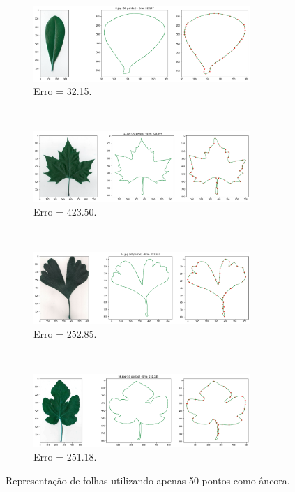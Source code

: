 \begin{figure}[H]
	\centering
	\begin{subfigure}[b]{\textwidth}
		\centering
		\includegraphics[width=0.9\textwidth]{img/res/0_50.png}
		\caption{Erro = 32.15.}
	\end{subfigure}
	\\
	\begin{subfigure}[b]{\textwidth}
		\centering
		\includegraphics[width=0.9\textwidth]{img/res/1_50.png}
		\caption{Erro = 423.50.}
	\end{subfigure}
	\\
	\begin{subfigure}[b]{\textwidth}
		\centering
		\includegraphics[width=0.9\textwidth]{img/res/2_50.png}
		\caption{Erro = 252.85.}
	\end{subfigure}
	\\
	\begin{subfigure}[b]{\textwidth}
		\centering
		\includegraphics[width=0.9\textwidth]{img/res/3_50.png}
		\caption{Erro = 251.18.}
	\end{subfigure}
	\caption{Representação de folhas utilizando apenas 50 pontos como âncora.}
	\label{fig:folha2rep}
\end{figure}



